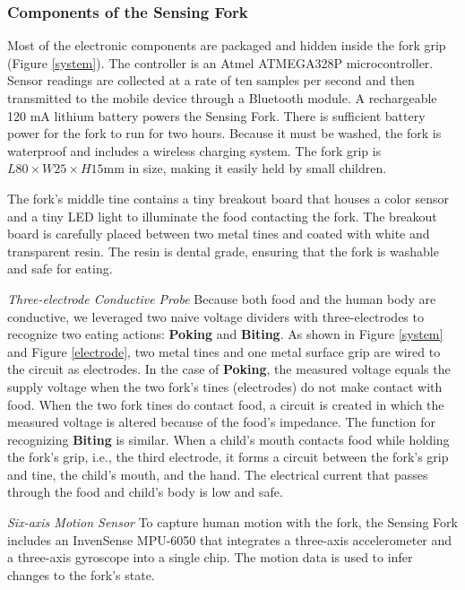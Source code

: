 \subsubsection{Components of the Sensing Fork}
Most of the electronic components 
are packaged and hidden inside the fork grip (Figure \ref{system}). 
The controller is an Atmel ATMEGA328P microcontroller. 
Sensor readings are collected at a rate of ten samples per second and then transmitted 
to the mobile device through a Bluetooth module. 
A rechargeable 120 mA lithium battery powers the Sensing Fork. 
There is sufficient battery power for the fork to run for two hours. 
Because it must be washed, the fork is waterproof and includes a wireless charging system. 
The fork grip is $L80 \times W25 \times H15$mm in size, 
making it easily held by small children. 

The fork's middle tine contains a tiny breakout board 
that houses a color sensor and a tiny LED light to illuminate the food contacting the fork. 
The breakout board is carefully placed between two metal tines and coated with white and transparent resin. 
The resin is dental grade, ensuring that the fork is washable and safe for eating. 

\textit{Three-electrode Conductive Probe}
\newline
Because both food and the human body are conductive, we leveraged two naive voltage dividers 
with three-electrodes to recognize two eating actions: \textbf{Poking} and \textbf{Biting}. 
As shown in Figure \ref{system} and Figure \ref{electrode}, 
two metal tines and one metal surface grip are wired to the circuit as electrodes. 
In the case of \textbf{Poking}, the measured voltage equals the supply voltage 
when the two fork's tines (electrodes) do not make contact with food. 
When the two fork tines do contact food, 
a circuit is created in which the measured voltage is altered because of the food's impedance. 
The function for recognizing \textbf{Biting} is similar. 
When a child's mouth contacts food while holding the fork's grip, i.e., the third electrode, 
it forms a circuit between the fork's grip and tine, the child's mouth, and the hand. 
The electrical current that passes through the food and child's body is low and safe. 

\textit{Six-axis Motion Sensor}
\newline
To capture human motion with the fork, the Sensing Fork includes an InvenSense MPU-6050 that integrates a three-axis accelerometer and a three-axis gyroscope into a single chip. The motion data is used to infer changes to the fork's state. 

